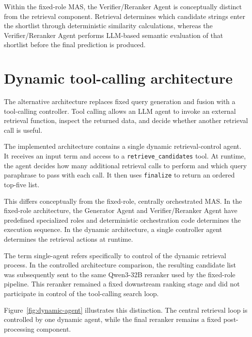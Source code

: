 Within the fixed-role MAS, the Verifier/Reranker Agent is conceptually distinct from the retrieval component. Retrieval determines which candidate strings enter the shortlist through deterministic similarity calculations, whereas the Verifier/Reranker Agent performs LLM-based semantic evaluation of that shortlist before the final prediction is produced.

\section{Dynamic tool-calling architecture}

The alternative architecture replaces fixed query generation and fusion with a tool-calling controller. Tool calling allows an LLM agent to invoke an external retrieval function, inspect the returned data, and decide whether another retrieval call is useful.

The implemented architecture contains a single dynamic retrieval-control agent. It receives an input term and access to a \texttt{retrieve\_candidates} tool. At runtime, the agent decides how many additional retrieval calls to perform and which query paraphrase to pass with each call. It then uses \texttt{finalize} to return an ordered top-five list.

This differs conceptually from the fixed-role, centrally orchestrated MAS. In the fixed-role architecture, the Generator Agent and Verifier/Reranker Agent have predefined specialized roles and deterministic orchestration code determines the execution sequence. In the dynamic architecture, a single controller agent determines the retrieval actions at runtime.

The term single-agent refers specifically to control of the dynamic retrieval process. In the controlled architecture comparison, the resulting candidate list was subsequently sent to the same Qwen3-32B reranker used by the fixed-role pipeline. This reranker remained a fixed downstream ranking stage and did not participate in control of the tool-calling search loop.

Figure~\ref{fig:dynamic-agent} illustrates this distinction. The central retrieval loop is controlled by one dynamic agent, while the final reranker remains a fixed post-processing component.

